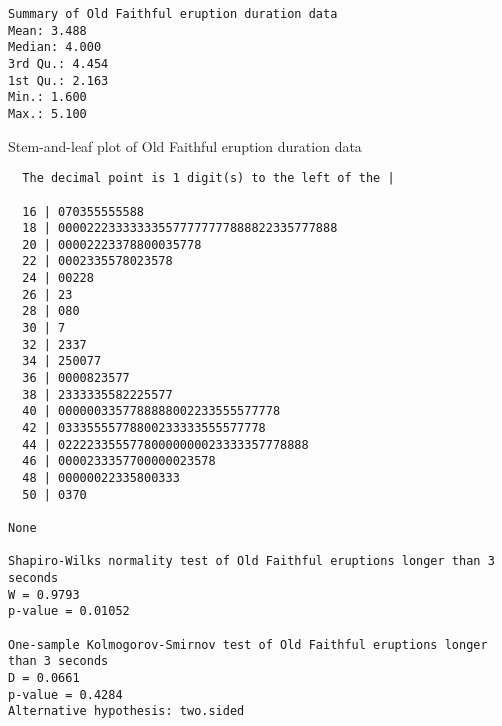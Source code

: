\documentclass[11pt]{article}
\begin{document}
\begin{verbatim}
Summary of Old Faithful eruption duration data
Mean: 3.488
Median: 4.000
3rd Qu.: 4.454
1st Qu.: 2.163
Min.: 1.600
Max.: 5.100
\end{verbatim}
Stem-and-leaf plot of Old Faithful eruption duration data
\begin{verbatim}
  The decimal point is 1 digit(s) to the left of the |

  16 | 070355555588
  18 | 000022233333335577777777888822335777888
  20 | 00002223378800035778
  22 | 0002335578023578
  24 | 00228
  26 | 23
  28 | 080
  30 | 7
  32 | 2337
  34 | 250077
  36 | 0000823577
  38 | 2333335582225577
  40 | 0000003357788888002233555577778
  42 | 03335555778800233333555577778
  44 | 02222335557780000000023333357778888
  46 | 0000233357700000023578
  48 | 00000022335800333
  50 | 0370

None

Shapiro-Wilks normality test of Old Faithful eruptions longer than 3 seconds
W = 0.9793
p-value = 0.01052

One-sample Kolmogorov-Smirnov test of Old Faithful eruptions longer than 3 seconds
D = 0.0661
p-value = 0.4284
Alternative hypothesis: two.sided
\end{verbatim}

\end{document}

